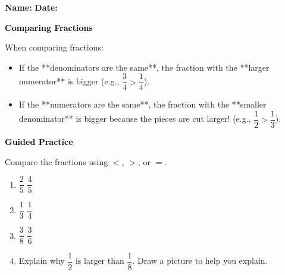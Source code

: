 \documentclass[12pt, letterpaper, fleqn]{article}
\newcommand{\blank}{\underline{\hspace{2.2cm}}}
\begin{document}
\textbf{Name:} \underline{\hspace{5cm}}
\hfill
\textbf{Date:} \underline{\hspace{3cm}}\\

\begin{tcolorbox}[colback=customteal!20]
    \large\textcolor{black}{\textbf{Comparing Fractions}}
\end{tcolorbox}

\vspace{3mm}
\noindent
When comparing fractions:
\begin{itemize}
    \item If the **denominators are the same**, the fraction with the **larger numerator** is bigger (e.g., $\dfrac{3}{4} > \dfrac{1}{4}$).
    \item If the **numerators are the same**, the fraction with the **smaller denominator** is bigger because the pieces are cut larger! (e.g., $\dfrac{1}{2} > \dfrac{1}{3}$).
\end{itemize}

\newpage
\begin{tcolorbox}[colback=customteal!20]
    \large\textcolor{black}{\textbf{Guided Practice}}
\end{tcolorbox}

\vspace{5mm}
\noindent
Compare the fractions using $<$, $>$, or $=$.

\vspace{8mm}
\begin{enumerate}[itemsep=2.5cm, leftmargin=0.6cm]
\item $\dfrac{2}{5}$ \blank $\dfrac{4}{5}$
\item $\dfrac{1}{3}$ \blank $\dfrac{1}{4}$
\item $\dfrac{3}{8}$ \blank $\dfrac{3}{6}$
\item Explain why $\dfrac{1}{2}$ is larger than $\dfrac{1}{8}$. Draw a picture to help you explain.
\vspace{4cm}
\end{enumerate}
\end{document}
